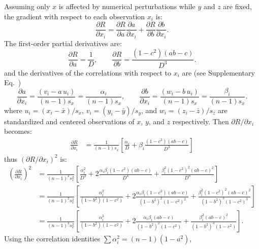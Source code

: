 Assuming only $x$ is affected by numerical perturbations while $y$ and $z$ are
fixed, the gradient with respect to each observation $x_i$ is:
\[
    \frac{\partial R}{\partial x_i}
    =
    \frac{\partial R}{\partial a}\frac{\partial a}{\partial x_i}
    +
    \frac{\partial R}{\partial b}\frac{\partial b}{\partial x_i}.
\]
The first-order partial derivatives are:
\[
    \frac{\partial R}{\partial a} = \frac{1}{D}, \qquad
    \frac{\partial R}{\partial b} = \frac{(1 - c^{2})(ab - c)}{D^{3}}.
\]
and the derivatives of the correlations with respect to $x_i$ are (see
Supplementary Eq.~)
\[
    \frac{\partial a}{\partial x_i}
    =
    \frac{(v_i - a\,u_i)}{(n-1)s_x} = \frac{\alpha_i}{(n-1)s_x},
    \qquad
    \frac{\partial b}{\partial x_i}
    = \frac{(w_i - b\,u_i)}{(n-1)s_x} = \frac{\beta_i}{(n-1)s_x}.
\]
where $u_i = (x_i - \bar{x})/s_x$, $v_i = (y_i - \bar{y})/s_y$, and $w_i = (z_i
    - \bar{z})/s_z$ are standardized and centered observations of $x$, $y$, and $z$
respectively. Then $\partial R / \partial x_i$ becomes:
\begin{align*}
    \frac{\partial R}{\partial x_i}
     & =
    \frac{1}{(n-1) s_x}
    \left[
        \frac{\alpha_i}{D} + \beta_i
        \frac{(1 - c^{2})(ab - c)}{D^{3}}
        \right]
\end{align*}
thus ${(\partial R / \partial x_i)}^{2}$ is:
\begin{align*}
    {\left(\frac{\partial R}{\partial x_i}\right)}^{2}
     & =
    \frac{1}{{(n-1)}^{2}s_{x}^{2}}
    \left[
        \frac{\alpha_i^{2}}{D^{2}}
        +
        2\frac{\alpha_i\beta_i{(1 - c^{2})}{(ab - c)}}{D^{4}}
        +
        \frac{\beta_i^{2}{(1 - c^{2})}^{2}{(ab - c)}^{2}}{D^{6}}
    \right]                             \\
     & =
    \frac{1}{{(n-1)}^{2}s_{x}^{2}}
    \left[
        \frac{\alpha_i^{2}}{(1 - b^{2})(1 - c^{2})}
        +
        2\frac{\alpha_i\beta_i{(1 - c^{2})}{(ab - c)}}{{(1 - b^{2})}^{2}{(1 - c^{2})}^{2}}
        +
        \frac{\beta_i^{2}{(1 - c^{2})}^{2}{(ab - c)}^{2}}{{(1 - b^{2})}^{3}{(1 - c^{2})}^{3}}
    \right]                             \\
     & = \frac{1}{{(n-1)}^{2}s_{x}^{2}}
    \left[
        \frac{\alpha_i^{2}}{(1 - b^{2})(1 - c^{2})}
        +
        2\frac{\alpha_i\beta_i(ab - c)}{{(1 - b^{2})}^{2}(1 - c^{2})}
        +
        \frac{\beta_i^{2}{(ab - c)}^{2}}{{(1 - b^{2})}^{3}(1 - c^{2})}
        \right].
\end{align*}
Using the correlation identities $\sum\alpha_i^2 = (n-1)(1 - a^{2})$,
